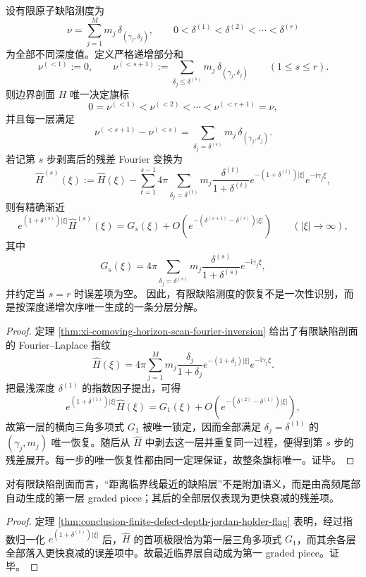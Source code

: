 \begin{theorem}\label{thm:conclusion-finite-defect-depth-jordan-holder-flag}
设有限原子缺陷测度为
\[
\nu=\sum_{j=1}^{M}m_j\,\delta_{(\gamma_j,\delta_j)},
\qquad
0<\delta^{(1)}<\delta^{(2)}<\cdots<\delta^{(r)}
\]
为全部不同深度值。定义严格递增部分和
\[
\nu^{(<1)}:=0,
\qquad
\nu^{(<s+1)}:=\sum_{\delta_j\le \delta^{(s)}}m_j\,\delta_{(\gamma_j,\delta_j)}
\qquad(1\le s\le r).
\]
则边界剖面 \(H\) 唯一决定旗标
\[
0=\nu^{(<1)}<\nu^{(<2)}<\cdots<\nu^{(<r+1)}=\nu,
\]
并且每一层满足
\[
\nu^{(<s+1)}-\nu^{(<s)}
=
\sum_{\delta_j=\delta^{(s)}}m_j\,\delta_{(\gamma_j,\delta_j)}.
\]
若记第 \(s\) 步剥离后的残差 Fourier 变换为
\[
\widehat H^{(s)}(\xi)
:=
\widehat H(\xi)-\sum_{t=1}^{s-1}
4\pi\sum_{\delta_j=\delta^{(t)}}
m_j\frac{\delta^{(t)}}{1+\delta^{(t)}}e^{-(1+\delta^{(t)})|\xi|}e^{-\mathrm{i}\gamma_j\xi},
\]
则有精确渐近
\[
e^{(1+\delta^{(s)})|\xi|}\widehat H^{(s)}(\xi)
=
G_s(\xi)+O\!\left(e^{-(\delta^{(s+1)}-\delta^{(s)})|\xi|}\right)
\qquad(|\xi|\to\infty),
\]
其中
\[
G_s(\xi)=
4\pi\sum_{\delta_j=\delta^{(s)}}
m_j\frac{\delta^{(s)}}{1+\delta^{(s)}}e^{-\mathrm{i}\gamma_j\xi},
\]
并约定当 \(s=r\) 时误差项为空。
因此，有限缺陷测度的恢复不是一次性识别，而是按深度递增次序唯一生成的一条分层分解。
\end{theorem}
\begin{proof}
定理 \ref{thm:xi-comoving-horizon-scan-fourier-inversion} 给出了有限缺陷剖面的 Fourier--Laplace 指纹
\[
\widehat H(\xi)=4\pi\sum_{j=1}^{M}m_j\frac{\delta_j}{1+\delta_j}e^{-(1+\delta_j)|\xi|}e^{-\mathrm{i}\gamma_j\xi}.
\]
把最浅深度 \(\delta^{(1)}\) 的指数因子提出，可得
\[
e^{(1+\delta^{(1)})|\xi|}\widehat H(\xi)
=
G_1(\xi)+O\!\left(e^{-(\delta^{(2)}-\delta^{(1)})|\xi|}\right),
\]
故第一层的横向三角多项式 \(G_1\) 被唯一锁定，因而全部满足 \(\delta_j=\delta^{(1)}\) 的 \((\gamma_j,m_j)\) 唯一恢复。随后从 \(\widehat H\) 中剥去这一层并重复同一过程，便得到第 \(s\) 步的残差展开。每一步的唯一恢复性都由同一定理保证，故整条旗标唯一。证毕。
\end{proof}

\begin{corollary}\label{cor:conclusion-finite-defect-nearest-critical-layer-graded-piece}
对有限缺陷剖面而言，“距离临界线最近的缺陷层”不是附加语义，而是由高频尾部自动生成的第一层 graded piece；其后的全部层仅表现为更快衰减的残差项。
\end{corollary}
\begin{proof}
定理 \ref{thm:conclusion-finite-defect-depth-jordan-holder-flag} 表明，经过指数归一化 \(e^{(1+\delta^{(1)})|\xi|}\) 后，\(\widehat H\) 的首项极限恰为第一层三角多项式 \(G_1\)，而其余各层全部落入更快衰减的误差项中。故最近临界层自动成为第一 graded piece。证毕。
\end{proof}

